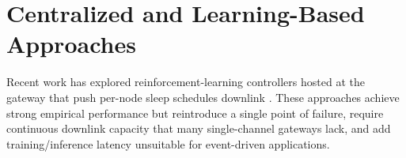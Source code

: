 \section{Centralized and Learning-Based Approaches}
Recent work has explored reinforcement-learning controllers hosted at the gateway that push
per-node sleep schedules downlink \cite{kim2020rl}. These approaches achieve strong empirical
performance but reintroduce a single point of failure, require continuous downlink capacity
that many single-channel gateways lack, and add training/inference latency unsuitable for
event-driven applications.
